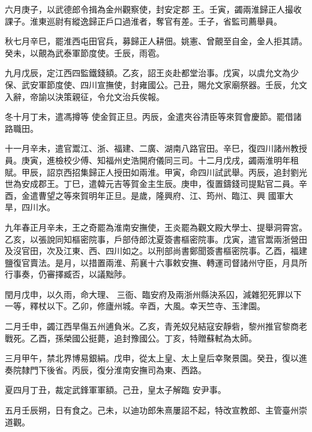 \begin{pinyinscope}
 六月庚子，以武德郎令揖為金州觀察使，封安定郡
 王。壬寅，蠲兩淮歸正人撮收課子。淮東巡尉有縱逸歸正戶口過淮者，奪官有差。壬子，省監司薦舉員。



 秋七月辛巳，罷淮西屯田官兵，募歸正人耕佃。姚憲、曾覿至自金，金人拒其請。癸未，以覿為武泰軍節度使。壬辰，雨雹。



 九月戊辰，定江西四監鐵錢額。乙亥，詔王炎赴都堂治事。戊寅，以虞允文為少保、武安軍節度使、四川宣撫使，封雍國公。己丑，賜允文家廟祭器。壬辰，允文入辭，帝諭以決策親征，令允文治兵俟報。



 冬十月丁未，遣馮撙等
 使金賀正旦。丙辰，金遣夾谷清臣等來賀會慶節。罷借諸路職田。



 十一月辛未，遣官鬻江、浙、福建、二廣、湖南八路官田。辛巳，復四川諸州教授員。庚寅，進檢校少傅、知福州史浩開府儀同三司。十二月戊戌，蠲兩淮明年租賦。甲辰，詔京西招集歸正人授田如兩淮。甲寅，命四川試武舉。丙辰，追封劉光世為安成郡王。丁巳，遣韓元吉等賀金主生辰。庚申，復置鑄錢司提點官二員。辛酉，金遣曹望之等來賀明年正旦。是歲，隆興府、江、筠州、臨江、興
 國軍大旱，四川水。



 九年春正月辛未，王之奇罷為淮南安撫使，王炎罷為觀文殿大學士、提舉洞霄宮。乙亥，以張說同知樞密院事，戶部侍郎沈夏簽書樞密院事。戊寅，遣官鬻兩浙營田及沒官田，次及江東、西、四川如之。以刑部尚書鄭聞簽書樞密院事。乙酉，福建鹽復官賣法。是月，以措置兩淮、荊襄十六事敕安撫、轉運司督諸州守臣，月具所行事奏，仍審擇臧否，以議黜陟。



 閏月戊申，以久雨，命大理、
 三衙、臨安府及兩浙州縣決系囚，減雜犯死罪以下一等，釋杖以下。乙卯，修廬州城。辛酉，大風。幸天竺寺、玉津園。



 二月壬申，蠲江西旱傷五州逋負米。乙亥，青羌奴兒結寇安靜砦，黎州推官黎商老戰死。乙酉，孫榮國公挺薨，追封豫國公。丁亥，特贈蘇軾為太師。



 三月甲午，禁北界博易銀絹。戊申，從太上皇、太上皇后幸聚景園。癸丑，復以進奏院隸門下後省。丙辰，復分淮南安撫司為東、西路。



 夏四月丁丑，裁定武鋒軍軍額。己丑，皇太子解臨
 安尹事。



 五月壬辰朔，日有食之。己未，以迪功郎朱熹屢詔不起，特改宣教郎、主管臺州崇道觀。




\end{pinyinscope}
